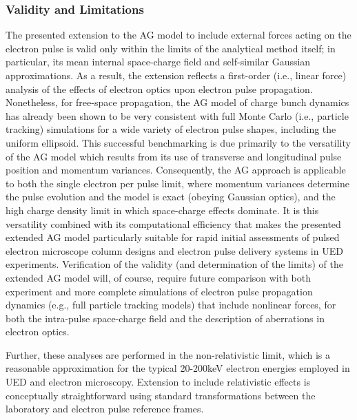 \subsubsection{Validity and Limitations}

The presented extension to the AG model to include external forces acting on the electron pulse is valid only within the limits of the analytical method itself; in particular, its mean internal space-charge field and self-similar Gaussian approximations.\cite{michalik_analytic_2006}
As a result, the extension reflects a first-order (i.e., linear force) analysis of the effects of electron optics upon electron pulse propagation.
Nonetheless, for free-space propagation, the AG model of charge bunch dynamics has already been shown to be very consistent with full Monte Carlo (i.e., particle tracking) simulations for a wide variety of electron pulse shapes,\cite{michalik_analytic_2006,michalik_evolution_2009} including the uniform ellipsoid.\cite{luiten_how_2004}
This successful benchmarking is due primarily to the versatility of the AG model which results from its use of transverse and longitudinal pulse position and momentum variances.
Consequently, the AG approach is applicable to both the single electron per pulse limit,\cite{lobastov_four-dimensional_2005} where momentum variances determine the pulse evolution and the model is exact (obeying Gaussian optics), and the high charge density limit in which space-charge effects dominate.\cite{luiten_how_2004,siwick_ultrafast_2002,cao_femtosecond_2003}
It is this versatility combined with its computational efficiency that makes the presented extended AG model particularly suitable for rapid initial assessments of pulsed electron microscope column designs and electron pulse delivery systems in UED experiments.
Verification of the validity (and determination of the limits) of the extended AG model will, of course, require future comparison with both experiment and more complete simulations of electron pulse propagation dynamics (e.g., full particle tracking models) that include nonlinear forces, for both the intra-pulse space-charge field and the description of aberrations in electron optics.

Further, these analyses are performed in the non-relativistic limit, which is a reasonable approximation for the typical 20-200keV electron energies employed in UED and electron microscopy.
Extension to include relativistic effects is conceptually straightforward using standard transformations between the laboratory and electron pulse reference frames.

